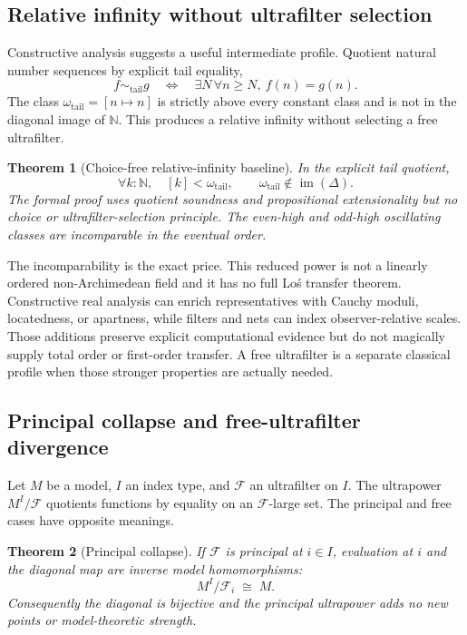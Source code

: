 \documentclass[11pt]{article}
\newtheorem{theorem}{Theorem}
\theoremstyle{definition}
\theoremstyle{remark}
\begin{document}
\subsection{Relative infinity without ultrafilter selection}

Constructive analysis suggests a useful intermediate profile.  Quotient natural
number sequences by explicit tail equality,
\[
  f\sim_{\mathrm{tail}}g
  \quad\Longleftrightarrow\quad
  \exists N\,\forall n\geq N,\ f(n)=g(n).
\]
The class $\omega_{\mathrm{tail}}=[n\mapsto n]$ is strictly above every constant
class and is not in the diagonal image of $\mathbb N$.  This produces a relative
infinity without selecting a free ultrafilter.

\begin{theorem}[Choice-free relative-infinity baseline]
In the explicit tail quotient,
\[
  \forall k:\mathbb N,\quad [k]<\omega_{\mathrm{tail}},
  \qquad
  \omega_{\mathrm{tail}}\notin\operatorname{im}(\Delta).
\]
The formal proof uses quotient soundness and propositional extensionality but no
choice or ultrafilter-selection principle.  The even-high and odd-high
oscillating classes are incomparable in the eventual order.
\end{theorem}

The incomparability is the exact price.  This reduced power is not a linearly
ordered non-Archimedean field and it has no full Lo\'s transfer theorem.
Constructive real analysis can enrich representatives with Cauchy moduli,
locatedness, or apartness, while filters and nets can index observer-relative
scales.  Those additions preserve explicit computational evidence but do not
magically supply total order or first-order transfer.  A free ultrafilter is a
separate classical profile when those stronger properties are actually needed.

\subsection{Principal collapse and free-ultrafilter divergence}

Let $M$ be a model, $I$ an index type, and $\mathcal F$ an ultrafilter on $I$.
The ultrapower $M^I/\mathcal F$ quotients functions by equality on an
$\mathcal F$-large set.  The principal and free cases have opposite meanings.

\begin{theorem}[Principal collapse]
If $\mathcal F$ is principal at $i\in I$, evaluation at $i$ and the diagonal map
are inverse model homomorphisms:
\[
  M^I/\mathcal F_i \;\cong\; M.
\]
Consequently the diagonal is bijective and the principal ultrapower adds no new
points or model-theoretic strength.
\end{theorem}
\end{document}
